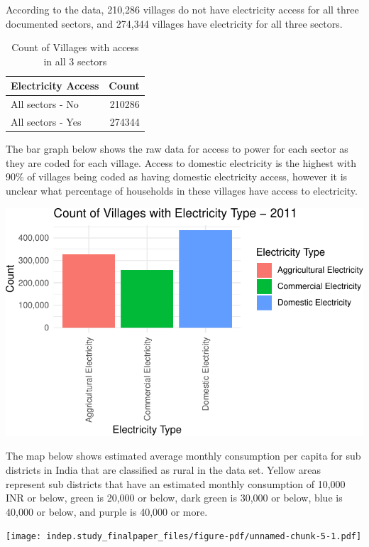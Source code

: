 \documentclass[
]{article}
\begin{document}
According to the data, 210,286 villages do not have electricity access
for all three documented sectors, and 274,344 villages have electricity
for all three sectors.

\begin{table}[!h]
\centering
\caption{Count of Villages with access in all 3 sectors}
\centering
\begin{tabular}[t]{lr}
\toprule
Electricity Access & Count\\
\midrule
All sectors - No & 210286\\
All sectors - Yes & 274344\\
\bottomrule
\end{tabular}
\end{table}

The bar graph below shows the raw data for access to power for each
sector as they are coded for each village. Access to domestic
electricity is the highest with 90\% of villages being coded as having
domestic electricity access, however it is unclear what percentage of
households in these villages have access to electricity.

\includegraphics{indep.study_finalpaper_files/figure-pdf/unnamed-chunk-3-1.pdf}

\newpage

The map below shows estimated average monthly consumption per capita for
sub districts in India that are classified as rural in the data set.
Yellow areas represent sub districts that have an estimated monthly
consumption of 10,000 INR or below, green is 20,000 or below, dark green
is 30,000 or below, blue is 40,000 or below, and purple is 40,000 or
more.

\texttt{[image: indep.study\_finalpaper\_files/figure-pdf/unnamed-chunk-5-1.pdf]}
\end{document}
